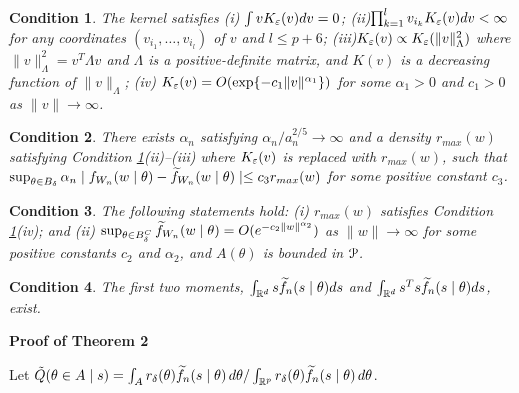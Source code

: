 \documentclass{article}
\newtheorem{condition}{Condition}
\begin{document}
\begin{condition} \label{kernel_prop}
	The kernel satisfies (i) $\int vK_{\varepsilon}(v)dv=0$; (ii)$\prod_{k=1}^{l}v_{i_{k}}K_{\varepsilon}(v)dv<\infty$
	for any coordinates $(v_{i_{1}},\dots,v_{i_{l}})$ of $v$ and $l\leq p+6$;
	(iii)$K_{\varepsilon}(v)\propto K_{\varepsilon}(\|v\|_{\Lambda}^{2})$ where $\|v\|_{\Lambda}^{2}=v^{T}\Lambda v$
	and $\Lambda$ is a positive-definite matrix, and $K(v)$ is a decreasing
	function of $\|v\|_{\Lambda}$; (iv) $K_{\varepsilon}(v)=O(\exp\{-c_{1}\|v\|^{\alpha_{1}}\})$
	for some $\alpha_{1}>0$ and $c_{1}>0$ as $\|v\|\rightarrow\infty$. 
\end{condition}

\begin{condition} \label{sum_approx}
	There exists $\alpha_{n}$ satisfying $\alpha_{n}/a_{n}^{2/5}\rightarrow\infty$
	and a density $r_{max}(w)$ satisfying Condition \ref{kernel_prop}(ii)--(iii) where $K_{\varepsilon}(v)$
	is replaced with $r_{max}(w)$, such that $\sup_{\theta\in B_{\delta}}\alpha_{n}\mid f_{W_{n}}(w\mid\theta)-\widetilde{f}_{W_{n}}(w\mid\theta)\mid\leq c_{3}r_{max}(w)$
	for some positive constant $c_{3}$. 
\end{condition}

\begin{condition} \label{sum_approx_tail}
	The following statements hold: (i) $r_{max}(w)$ satisfies
	Condition \ref{kernel_prop}(iv); and (ii) $\sup_{\theta\in B_{\delta}^{C}}\widetilde{f}_{W_{n}}(w\mid\theta)=O(e^{-c_{2}\|w\|^{\alpha_{2}}})$
	as $\|w\|\rightarrow\infty$ for some positive constants $c_{2}$
	and $\alpha_{2}$, and $A(\theta)$ is bounded in ${\cal P}$. 
\end{condition}

\begin{condition} \label{cond:likelihood_moments}
	The first two moments, $\int_{\mathbb{R}^{d}}s\widetilde{f}_{n}(s\mid\theta)ds$
	and $\int_{\mathbb{R}^d}s^{T}s\widetilde{f}_{n}(s\mid\theta)ds$, exist. 
\end{condition}


{\bf Proof of Theorem 2}

\noindent Let $\tilde{Q}(\theta\in A\mid s)=\int_{A}r_{\delta}(\theta)\widetilde{f}_{n}(s\mid\theta)\,d\theta/\int_{\mathbb{R}^{p}}r_{\delta}(\theta)\widetilde{f}_{n}(s\mid\theta)\,d\theta$. 
\end{document}

